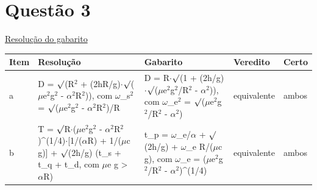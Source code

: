\documentclass{article}%
\begin{document}
\section*{Questão 3}%
\href{https://poliedroresolve.sistemapoliedro.com.br/vestibulares/ita/2027/ita-2-fase-dia-3-22-10-2026-2-fase-dia-3/dissertativa-3-fisica-2-fase-dia-3-ita-2027}{Resolução do gabarito}\par\smallskip%
\begin{longtable}{@{}p{} p{} p{} p{} p{}@{}}\toprule Item & Resolução & Gabarito & Veredito & Certo \\ \midrule
a & D = $\surd$(R$^2$ + (2hR/g)$\cdot$$\surd$($\mu$e$^2$g$^2$ - $\alpha$$^2$R$^2$)), com $\omega$\_s$^2$ = $\surd$($\mu$e$^2$g$^2$ - $\alpha$$^2$R$^2$)/R & D = R$\cdot$$\surd$(1 + (2h/g)$\cdot$$\surd$($\mu$e$^2$g$^2$/R$^2$ - $\alpha$$^2$)), com $\omega$\_e$^2$ = $\surd$($\mu$e$^2$g$^2$/R$^2$ - $\alpha$$^2$) & equivalente & ambos \\
b & T = $\surd$R$\cdot$($\mu$e$^2$g$^2$ - $\alpha$$^2$R$^2$)\^{}(1/4)$\cdot${[}1/($\alpha$R) + 1/($\mu$c g){]} + $\surd$(2h/g)  (t\_s + t\_q + t\_d, com $\mu$e g > $\alpha$R) & t\_p = $\omega$\_e/$\alpha$ + $\surd$(2h/g) + $\omega$\_e R/($\mu$c g), com $\omega$\_e = ($\mu$e$^2$g$^2$/R$^2$ - $\alpha$$^2$)\^{}(1/4) & equivalente & ambos \\
\bottomrule\end{longtable}%
\end{document}
